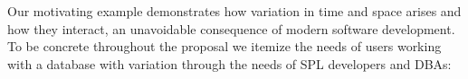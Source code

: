 
Our motivating example demonstrates how variation in time and space
arises and how they interact, an unavoidable consequence of modern software
development.
To be concrete throughout the proposal we itemize
the needs of users working with a database with variation
through the needs of SPL developers and DBAs:
%

